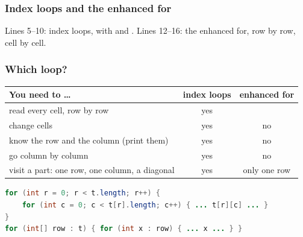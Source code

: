 \documentclass[aspectratio=169,10pt,compress]{beamer}
\begin{document}




\begin{frame}[t,fragile] \frametitle{Index loops and the enhanced for}

	\footnotesize Lines 5--10: index loops, with  and . Lines 12--16: the enhanced for, row by row, cell by cell.
\end{frame}




\begin{frame}[t,fragile] \frametitle{Which loop?}


\begin{table}
		\small
		\begin{tabular}{@{}L{0.48\textwidth}cc@{}}
			\toprule
			\textbf{You need to \dots} & \textbf{index loops} & \textbf{enhanced for} \\
			\midrule
			read every cell, row by row                 & yes &  \\
			change cells                                & yes & no \\
			know the row and the column (print them)    & yes & no \\
			go column by column                         & yes & no \\
			visit a part: one row, one column, a diagonal & yes & only one row \\
			\bottomrule
		\end{tabular}
\end{table}%




\begin{lstlisting}[style=codesnippet, language=Java]
for (int r = 0; r < t.length; r++) {
    for (int c = 0; c < t[r].length; c++) { ... t[r][c] ... }
}
for (int[] row : t) { for (int x : row) { ... x ... } }
\end{lstlisting}


\end{frame}
\end{document}
